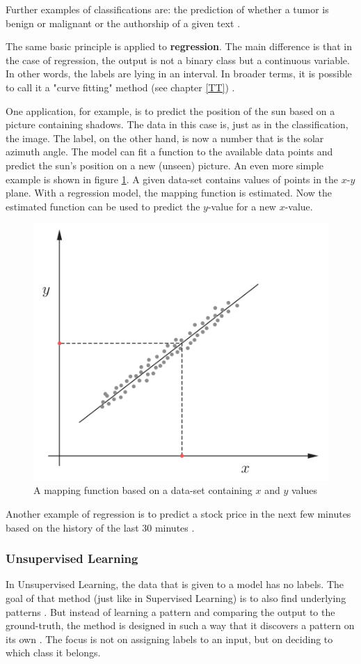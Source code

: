 Further examples of classifications are: the prediction of whether a tumor is benign or malignant or the authorship of a given text \cite{Theodoridis}.


The same basic principle is applied to \textbf{regression}. The main difference is that in the case of regression, the output is not a binary class but a continuous variable. In other words, the labels are lying in an interval. In broader terms, it is possible to call it a "curve fitting" method (see chapter \ref{TT}) \cite{Theodoridis}.

One application, for example, is to predict the position of the sun based on a picture containing shadows. The data in this case is, just as in the classification, the image. The label, on the other hand, is now a number that is the solar azimuth angle. The model can fit a function to the available data points and predict the sun's position on a new (unseen) picture.
An even more simple example is shown in figure \ref{fig:SimpleRegression}. A given data-set contains values of points in the \(x\)-\(y\) plane. With a regression model, the mapping function is estimated. Now the estimated function can be used to predict the \(y\)-value for a new \(x\)-value. 

\begin{figure}[H]
	\centering
	\includegraphics[width=0.5\linewidth]{IMGs/SimpleRegression.png}
	\caption{A mapping function based on a data-set containing \(x\) and \(y\) values \cite{Theodoridis}}
	\label{fig:SimpleRegression}
\end{figure}


Another example of regression is to predict a stock price in the next few minutes based on the history of the last 30 minutes \cite{Janiesch}.



\subsubsection*{Unsupervised Learning}
In Unsupervised Learning, the data that is given to a model has no labels. The goal of that method (just like in Supervised Learning) is to also find underlying patterns \cite{Carleo}. But instead of learning a pattern and comparing the output to the ground-truth, the method is designed in such a way that it discovers a pattern on its own \cite{Murphy}. The focus is not on assigning labels to an input, but on deciding to which class it belongs.

